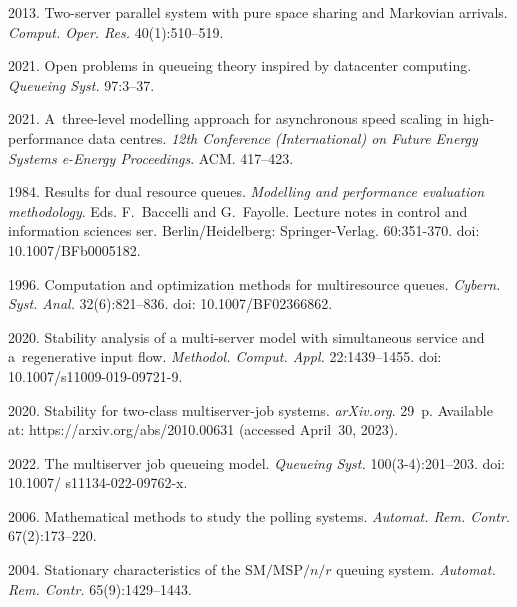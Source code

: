 \begin{multicols}{2}
{{\begin{thebibliography}{99}
 2013.
Two-server parallel system with pure space sharing and Markovian arrivals.
\textit{Comput. Oper. Res.}   40(1):510--519.

 2021. Open problems in queueing theory inspired by datacenter
computing. \textit{Queueing Syst.} 97:3--37.

 2021.
 A~three-level modelling approach for asynchronous speed scaling in high-performance data centres.
 \textit{12th  Conference (International) on Future Energy Systems \mbox{e-Energy} Proceedings}.  
 ACM. 417--423.
 
 1984. Results for dual resource queues.
\textit{Modelling and performance evaluation methodology}. Eds. F.~Baccelli and G.~Fayolle.
Lecture notes in control and information sciences ser. Berlin/Heidelberg: Springer-Verlag.
60:351-370. doi: 10.1007/BFb0005182.



 1996.
Computation and optimization methods for multiresource queues. 
\textit{Cybern. Syst. Anal.} 
32(6):821--836. doi: 10.1007/BF02366862.



 2020.
Stability analysis of a multi-server model with simultaneous service and a~regenerative input 
flow. \textit{Methodol. Comput. Appl.} 22:1439--1455. doi: 10.1007/s11009-019-09721-9.

 2020.
Stability for two-class multiserver-job systems.
\textit{\mbox{arXiv}.org}. 29~p. 
Available at: {\sf https://arxiv.org/abs/2010.00631} (accessed April~30, 2023).

 2022.
The multiserver job queueing model.
\textit{Queueing Syst.} 100(3-4):201--203. doi: 10.1007/ s11134-022-09762-x.

 2006.
Mathematical methods to study the polling systems.
\textit{Automat. Rem. Contr.} 67(2):173--220.

 2004. 
 Stationary characteristics of the ${\mathrm{SM}/\mathrm{MSP}/n/r}$ queuing system.
\textit{Automat. Rem. Contr.} 65(9):1429--1443.


\end{thebibliography}}}
\end{multicols}
